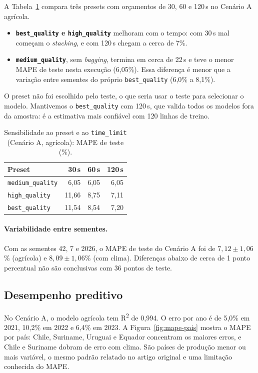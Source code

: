 \documentclass[a4paper,11pt]{article}
\begin{document}
A Tabela~\ref{tab:sensibilidade} compara três presets com orçamentos de 30, 60 e 120\,s no
Cenário A agrícola.
\begin{itemize}
  \item \textbf{\texttt{best\_quality} e \texttt{high\_quality}} melhoram com o tempo: com
  30\,s mal começam o \textit{stacking}, e com 120\,s chegam a cerca de 7\%.
  \item \textbf{\texttt{medium\_quality}}, sem \textit{bagging}, termina em cerca de 22\,s e
  teve o menor MAPE de teste nesta execução (6,05\%). Essa diferença é menor que a variação
  entre sementes do próprio \texttt{best\_quality} (6,0\% a 8,1\%).
\end{itemize}
O preset não foi escolhido pelo teste, o que seria usar o teste para selecionar o modelo.
Mantivemos o \texttt{best\_quality} com 120\,s, que valida todos os modelos fora da amostra:
é a estimativa mais confiável com 120 linhas de treino.

\begin{table}[H]
\centering
\caption{Sensibilidade ao preset e ao \texttt{time\_limit} (Cenário A, agrícola): MAPE de teste (\%).}
\label{tab:sensibilidade}
\begin{tabular}{@{}lrrr@{}}
\toprule
Preset & 30\,s & 60\,s & 120\,s \\
\midrule
\texttt{medium\_quality} & 6,05 & 6,05 & 6,05 \\
\texttt{high\_quality} & 11,66 & 8,75 & 7,11 \\
\texttt{best\_quality} & 11,54 & 8,54 & 7,20 \\
\bottomrule
\end{tabular}
\end{table}

\paragraph{Variabilidade entre sementes.} Com as sementes 42, 7 e 2026, o MAPE de teste do
Cenário A foi de $7{,}12 \pm 1{,}06$\% (agrícola) e $8{,}09 \pm 1{,}06$\% (com clima). Diferenças
abaixo de cerca de 1 ponto percentual não são conclusivas com 36 pontos de teste.

\subsection{Desempenho preditivo}

No Cenário A, o modelo agrícola tem R\textsuperscript{2} de 0,994. O erro por ano é de 5,0\%
em 2021, 10,2\% em 2022 e 6,4\% em 2023. A Figura~\ref{fig:mape-pais} mostra o MAPE por
país: Chile, Suriname, Uruguai e Equador concentram os maiores erros, e Chile e Suriname
dobram de erro com clima. São países de produção menor ou mais variável, o mesmo padrão
relatado no artigo original e uma limitação conhecida do MAPE.
\end{document}
